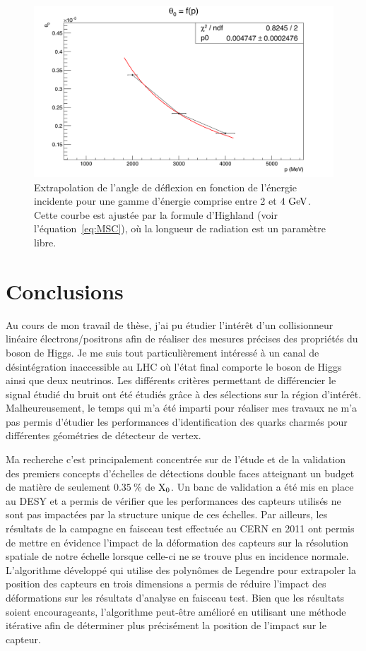   \begin{figure}[!h]
     \centering
     \includegraphics[width = \textwidth]{Pictures/X0/theta0VsP_2-4GeV.png}
     \caption{Extrapolation de l'angle de déflexion en fonction de l'énergie incidente pour une gamme d'énergie comprise entre 2 et $4~\rm{GeV}$.
     Cette courbe est ajustée par la formule d'Highland (voir l'équation~\ref{eq:MSC}), où la longueur de radiation est un paramètre libre.}
     \label{fig:theta0_2-4}
   \end{figure}

  \section{Conclusions}
 
  Au cours de mon travail de thèse, j'ai pu étudier l'intérêt d'un collisionneur linéaire électrons/positrons afin de réaliser des mesures précises des propriétés du boson de Higgs.
  Je me suis tout particulièrement intéressé à un canal de désintégration inaccessible au LHC où l'état final comporte le boson de Higgs ainsi que deux neutrinos. 
  Les différents critères permettant de différencier le signal étudié du bruit ont été étudiés grâce à des sélections sur la région d'intérêt.
  Malheureusement, le temps qui m'a été imparti pour réaliser mes travaux ne m'a pas permis d'étudier les performances d'identification des quarks charmés pour différentes géométries de détecteur de vertex.

  Ma recherche c'est principalement concentrée sur de l'étude et de la validation des premiers concepts d'échelles de détections double faces atteignant un budget de matière de seulement $0.35~\%$ de $\rm{X_0}$.
  Un banc de validation a été mis en place au DESY et a permis de vérifier que les performances des capteurs utilisés ne sont pas impactées par la structure unique de ces échelles.
  Par ailleurs, les résultats de la campagne en faisceau test effectuée au CERN en 2011 ont permis de mettre en évidence l'impact de la déformation des capteurs sur la résolution spatiale de notre échelle lorsque celle-ci ne se trouve plus en incidence normale.
  L'algorithme développé qui utilise des polynômes de Legendre pour extrapoler la position des capteurs en trois dimensions a permis de réduire l'impact des déformations sur les résultats d'analyse en faisceau test.
  Bien que les résultats soient encourageants, l'algorithme peut-être amélioré en utilisant une méthode itérative afin de déterminer plus précisément la position de l'impact sur le capteur.
  
